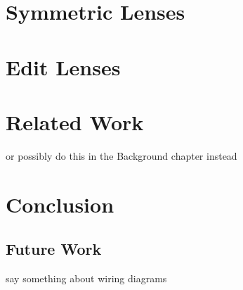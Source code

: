 \documentclass[12pt]{report}
\numberwithin{equation}{section}
\begin{document}


\chapter{Symmetric Lenses}
\label{chap:complement}



\chapter{Edit Lenses}
\label{chap:delta}

\mlinjargs\mlinjnoargs

%
%
%
%
%

\chapter{Related Work}

or possibly do this in the Background chapter instead

\chapter{Conclusion}
\label{chap:conclusion}

\section{Future Work}
\label{sec:future}

say something about wiring diagrams



\end{document}
